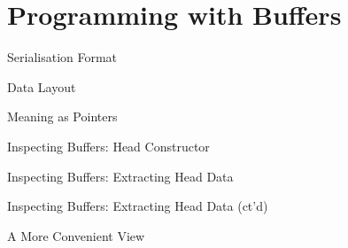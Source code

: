 
\section{Programming with Buffers}

\begin{frame}{Serialisation Format}
\vfill

\end{frame}

\begin{frame}{Data Layout}
  \begin{minipage}{\textwidth}
    \hspace{-1.5em}
    
  \end{minipage}
  \vfill
  
\end{frame}

\begin{frame}{Meaning as Pointers}

\end{frame}

\begin{frame}{Inspecting Buffers: Head Constructor}
\end{frame}

\begin{frame}{Inspecting Buffers: Extracting Head Data}
\end{frame}
\begin{frame}{Inspecting Buffers: Extracting Head Data (ct'd)}
\end{frame}

\begin{frame}{A More Convenient View}
\end{frame}
